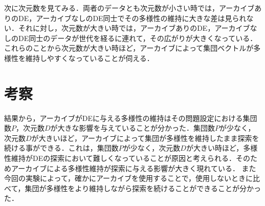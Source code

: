 \documentclass[a4paper,11pt,oneside,openany]{jsbook}
\begin{document}
次に次元数を見てみる．両者のデータとも次元数が小さい時では，アーカイブありのDE，アーカイブなしのDE同士でその多様性の維持に大きな差は見られない．それに対し，次元数が大きい時では，アーカイブありのDE，アーカイブなしのDE同士のデータが世代を経るに連れて，その広がりが大きくなっている．これらのことから次元数が大きい時ほど，アーカイブによって集団ベクトルが多様性を維持しやすくなっていることが伺える．

\section{考察}
結果から，アーカイブがDEに与える多様性の維持はその問題設定における集団数$P$，次元数$D$が大きな影響を与えていることが分かった．集団数$P$が少なく，次元数$D$が大きいほど，アーカイブによって集団が多様性を維持したまま探索を続ける事ができる．これは，集団数$P$が少なく，次元数$D$が大きい時ほど，多様性維持がDEの探索において難しくなっていることが原因と考えられる．そのためアーカイブによる多様性維持が探索に与える影響が大きく現れている．
また今回の実験によって，確かにアーカイブを使用することで，使用しないときに比べて，集団が多様性をより維持しながら探索を続けることができることが分かった．
\end{document}
